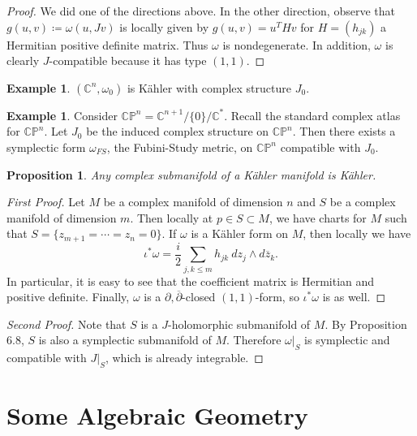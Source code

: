 \documentclass[leqno, openany]{memoir}
\newtheorem{prop}[thm]{Proposition}
\theoremstyle{definition}
\newtheorem{exm}[thm]{Example}
\theoremstyle{remark}
\theoremstyle{plain}
\theoremstyle{definition}
\theoremstyle{remark}
\newcommand{\C}{\mathbb{C}}
\renewcommand{\P}{\mathbb{P}}
\begin{document}
\begin{proof}
    We did one of the directions above. In the other direction, observe that $g(u,v) \coloneqq \omega(u, Jv)$ is locally given by $g(u,v) = u^THv$ for $H = (h_{jk})$ a Hermitian positive definite matrix. Thus $\omega$ is nondegenerate. In addition, $\omega$ is clearly $J$-compatible because it has type $(1,1)$.
\end{proof}

\begin{exm}
    $(\C^n, \omega_0)$ is K\"ahler with complex structure $J_0$.
\end{exm}

\begin{exm}
    Consider $\C\P^n = \C^{n+1}/\{0\} / \C^*$. Recall the standard complex atlas for $\C\P^n$. Let $J_0$ be the induced complex structure on $\C\P^n$. Then there exists a symplectic form $\omega_{FS}$, the Fubini-Study metric, on $\C\P^n$ compatible with $J_0$.
\end{exm}

\begin{prop}
    Any complex submanifold of a K\"ahler manifold is K\"ahler.
\end{prop}

\begin{proof}[First Proof]
    Let $M$ be a complex manifold of dimension $n$ and $S$ be a complex manifold of dimension $m$. Then locally at $p \in S \subset M$, we have charts for $M$ such that $S = \{ z_{m+1} = \cdots = z_n = 0 \}$. If $\omega$ is a K\"ahler form on $M$, then locally we have
    \[ \iota^* \omega = \frac{i}{2} \sum_{j,k \leq m} h_{jk}\ dz_j \wedge d\overline{z}_k.\]
    In particular, it is easy to see that the coefficient matrix is Hermitian and positive definite. Finally, $\omega$ is a $\partial, \overline{\partial}$-closed $(1,1)$-form, so $\iota^*\omega$ is as well.
\end{proof}

\begin{proof}[Second Proof]
    Note that $S$ is a $J$-holomorphic submanifold of $M$. By Proposition 6.8, $S$ is also a symplectic submanifold of $M$. Therefore $\omega|_S$ is symplectic and compatible with $J|_S$, which is already integrable.
\end{proof}

\section{Some Algebraic Geometry}%
\label{sec:some_algebraic_geometry}
\end{document}

